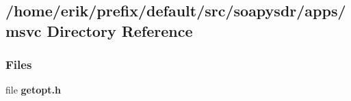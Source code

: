 \subsection{/home/erik/prefix/default/src/soapysdr/apps/msvc Directory Reference}
\label{dir_9dc7585da2aea1c956bf74911604b801}
\subsubsection*{Files}
\begin{DoxyCompactItemize}
\item 
file {\bf getopt.\+h}
\end{DoxyCompactItemize}
